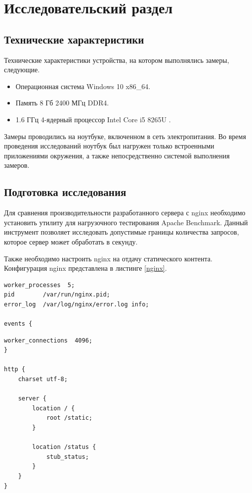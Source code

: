 \section{Исследовательский раздел}

\subsection{Технические характеристики}

Технические характеристики устройства, на котором выполнялись замеры, следующие.

\begin{itemize}[label=---]
	\item Операционная система Windows 10 \cite{oswind} x86\_64.
	\item Память 8 Гб 2400 МГц DDR4.
	\item 1.6 ГГц 4-ядерный процессор Intel Core i5 8265U \cite{intel}.
\end{itemize}

Замеры проводились на ноутбуке, включенном в сеть электропитания. Во время проведения исследований ноутбук был нагружен только встроенными приложениями окружения, а также непосредственно системой выполнения замеров.

\subsection{Подготовка исследования}

Для сравнения производительности разработанного сервера с nginx необходимо установить утилиту для нагрузочного тестирования Apache Benchmark. Данный инструмент позволяет исследовать допустимые границы количества запросов, которое сервер может обработать в секунду.

Также необходимо настроить nginx на отдачу статического контента. Конфигурация nginx представлена в листинге \ref{nginx}.

\begin{lstlisting}[caption={Конфигурация nginx}, label=nginx]
worker_processes  5;
pid        /var/run/nginx.pid;
error_log  /var/log/nginx/error.log info;

events {
\end{lstlisting}

\begin{lstlisting}[title={Продолжение листинга \ref{nginx}}, label=nginx1, firstnumber=6]
	worker_connections  4096; 
}

http {
	charset utf-8;
	
	server { 
		location / {
			root /static;
		}
		
		location /status {
			stub_status;
		}
	}
}
\end{lstlisting}

